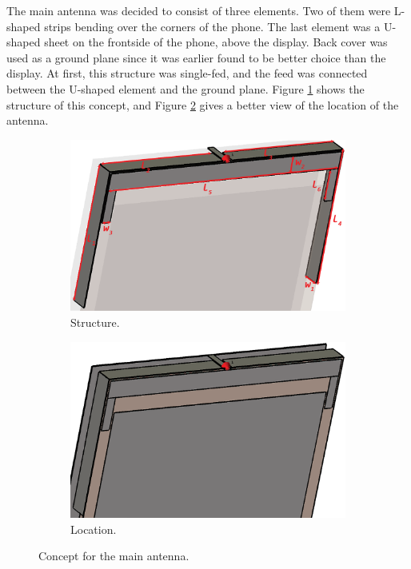 The main antenna was decided to consist of three elements. Two of them were L-shaped strips bending over the corners of the phone. The last element was a U-shaped sheet on the frontside of the phone, above the display. Back cover was used as a ground plane since it was earlier found to be better choice than the display. At first, this structure was single-fed, and the feed was connected between the U-shaped element and the ground plane. Figure \ref{fig:main_concept} shows the structure of this concept, and Figure \ref{fig:main_location} gives a better view of the location of the antenna.

\begin{figure}[H]
    \centering
    \begin{subfigure}[b]{0.49\textwidth}
        \includegraphics[width=\textwidth]{img/main_concept.eps}
        \caption{Structure.}
        \label{fig:main_concept}
    \end{subfigure}
    \begin{subfigure}[b]{0.49\textwidth}
        \includegraphics[width=\textwidth]{img/main_location.eps}
        \caption{Location.}
        \label{fig:main_location}
    \end{subfigure}
    \caption{Concept for the main antenna.}
    \label{fig:main_antenna1}
\end{figure}

